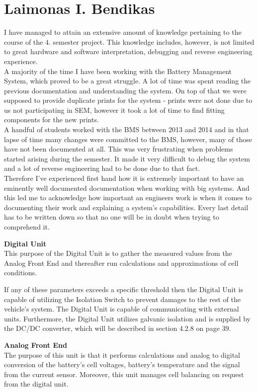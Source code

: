 \section{Laimonas I. Bendikas}
I have managed to attain an extensive amount of knowledge pertaining to the course of the 4. semester project. This knowledge includes, however, is not limited to great hardware and software interpretation, debugging and reverse engineering experience.\\
A majority of the time I have been working with the Battery Management System, which proved to be a great struggle. A lot of time was spent reading the previous documentation and understanding the system. On top of that we were supposed to provide duplicate prints for the system - prints were not done due to us not participating in SEM, however it took a lot of time to find fitting components for the new prints.\\
A handful of students worked with the BMS between 2013 and 2014 and in that lapse of time many changes were committed to the BMS, however, many of those have not been documented at all. This was very frustrating when problems started arising during the semester. It made it very difficult to debug the system and a lot of reverse engineering had to be done due to that fact.\\
Therefore I've experienced first hand how it is extremely important to have an eminently well documented documentation when working with big systems. And this led me to acknowledge how important an engineers work is when it comes to documenting their work and explaining a system's capabilities. Every last detail has to be written down so that no one will be in doubt when trying to comprehend it. 

\textbf{Digital Unit}\\
This purpose of the Digital Unit is to gather the measured values from the Analog Front End and thereafter run calculations and approximations of cell conditions. 

If any of these parameters exceeds a specific threshold then the Digital Unit is capable of utilizing the Isolation Switch to prevent damages to the rest of the vehicle's system. The Digital Unit is capable of communicating with external units. Furthermore, the Digital Unit utilizes galvanic isolation and is supplied by the DC/DC converter, which will be described in section 4.2.8 on page 39.

\textbf{Analog Front End}\\
The purpose of this unit is that it performs calculations and analog to digital conversion of the battery's cell voltages, battery's temperature and the signal from the current sensor. Moreover, this unit manages cell balancing on request from the digital unit. 

